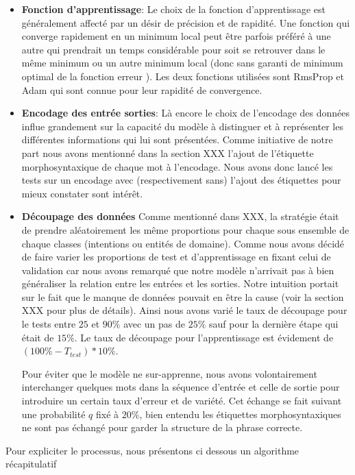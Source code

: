 \begin{itemize}
		\item \textbf{Fonction d'apprentissage}:
		Le choix de la fonction d'apprentissage est généralement affecté par un désir de précision et de rapidité. Une fonction qui converge rapidement en un minimum local peut être parfois préféré à une autre qui prendrait un temps considérable pour soit se retrouver dans le même minimum ou un autre minimum local (donc sans garanti de minimum optimal de la fonction erreur ). Les deux fonctions utilisées sont RmsProp et Adam qui sont connue pour leur rapidité de convergence.
		
		\item \textbf{Encodage des entrée sorties}:
		Là encore le choix de l'encodage des données influe grandement sur la capacité du modèle à distinguer et à représenter les différentes informations qui lui sont présentées. Comme initiative de notre part nous avons mentionné dans la section XXX l'ajout de l'étiquette morphosyntaxique de chaque mot à l'encodage. Nous avons donc lancé les tests sur un encodage avec (respectivement sans) l'ajout des étiquettes pour mieux constater sont intérêt.
		
		\item \textbf{Découpage des données}
		Comme mentionné dans XXX, la stratégie était de prendre aléatoirement les même proportions pour chaque sous ensemble de chaque classes (intentions ou entités de domaine). Comme nous avons décidé de faire varier les proportions de test et d'apprentissage en fixant celui de validation car nous avons remarqué que notre modèle n'arrivait pas à bien généraliser la relation entre les entrées et les sorties. Notre intuition portait sur le fait que le manque de données pouvait en être la cause (voir la section XXX pour plus de détails). Ainsi nous avons varié le taux de découpage pour le tests entre $25$ et $90\%$ avec un pas de $25\%$ sauf pour la dernière étape qui était de $15\%$. Le taux de découpage pour l'apprentissage est évidement de $(100\%-T_{test})*10\%$.
		\par
		Pour éviter que le modèle ne sur-apprenne, nous avons volontairement interchanger quelques mots dans la séquence d'entrée et celle de sortie pour introduire un certain taux d'erreur et de variété. Cet échange se fait suivant une probabilité $q$ fixé à $20\%$, bien entendu les étiquettes morphosyntaxiques ne sont pas échangé pour garder la structure de la phrase correcte.
	\end{itemize}
	\par
	Pour expliciter le processus, nous présentons ci dessous un algorithme récapitulatif
